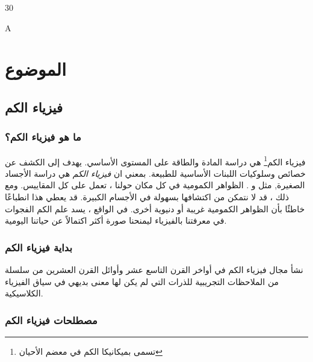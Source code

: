 \documentclass[a4paper,12pt,openright,twoside]{book}
\DeclareRobustCommand\besmellah[1][1.1]{	
	\begin{SetUnsetFont}[Besmellah B]{#1}
		\centerline{A}
	\end{SetUnsetFont}
}
\begin{document}



\newpage \null \newpage

\vspace*{1.0in} \besmellah[30]

\setlength{\headheight}{18.79199pt}

\tableofcontents
\thispagestyle{empty}



\chapter{الموضوع}

\section{فيزياء الكم}

\subsection{ما هو فيزياء الكم؟}

فيزياء الكم\footnote{تسمى بميكانيكا الكم في معضم الأحيان} هي دراسة المادة والطاقة على المستوى الأساسي. يهدف إلى الكشف عن خصائص وسلوكيات اللبنات الأساسية للطبيعة.
بمعني ان 
\emph{فيزياء الكم}
هي دراسة الأجساد الصغيرة, مثل 
و
. الظواهر الكمومية في كل مكان حولنا ، تعمل على كل المقاييس. ومع ذلك ، قد لا نتمكن من اكتشافها بسهولة في الأجسام الكبيرة. قد يعطي هذا انطباعًا خاطئًا بأن الظواهر الكمومية غريبة أو دنيوية أخرى. في الواقع ، يسد علم الكم الفجوات في معرفتنا بالفيزياء ليمنحنا صورة أكثر اكتمالاً عن حياتنا اليومية.

\subsection{بداية فيزياء الكم}

نشأ مجال فيزياء الكم في أواخر القرن التاسع عشر وأوائل القرن العشرين من سلسلة من الملاحظات التجريبية للذرات التي لم يكن لها معنى بديهي في سياق الفيزياء الكلاسيكية.

\subsection{مصطلحات فيزياء الكم}
\end{document}
